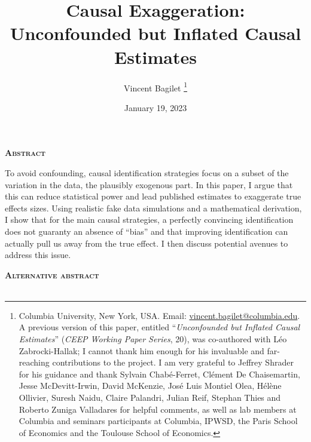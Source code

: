 \documentclass[usletter, 12pt]{article}
\begin{document}

	
	\title{Causal Exaggeration: \\ Unconfounded but Inflated Causal Estimates}

	\author{Vincent Bagilet
		\thanks{Columbia University, New York, USA. Email: \url{vincent.bagilet@columbia.edu}. 
			A previous version of this paper, entitled ``\textit{Unconfounded but Inflated Causal Estimates}'' (\textit{CEEP Working Paper Series}, 20), was co-authored with Léo Zabrocki-Hallak; I cannot thank him enough for his invaluable and far-reaching contributions to the project. I am very grateful to Jeffrey Shrader for his guidance and thank Sylvain Chabé-Ferret, Clément De Chaisemartin, Jesse McDevitt-Irwin, David McKenzie, José Luis Montiel Olea, Hélène Ollivier, Suresh Naidu, Claire Palandri, Julian Reif, Stephan Thies and Roberto Zuniga Valladares for helpful comments, as well as lab members at Columbia and seminars participants at Columbia, IPWSD, the Paris School of Economics and the Toulouse School of Economics.}
	}
	

	\date{January 19, 2023}
	
	
	\maketitle
	
	\begin{center}
		\large \textsc{\textbf{Abstract}}\\
	\end{center}
		
		To avoid confounding, causal identification strategies focus on a subset of the variation in the data, the plausibly exogenous part. In this paper, I argue that this can reduce statistical power and lead published estimates to exaggerate true effects sizes. Using realistic fake data simulations and a mathematical derivation, I show that for the main causal strategies, a perfectly convincing identification does not guaranty an absence of ``bias'' and that improving identification can actually pull us away from the true effect. I then discuss potential avenues to address this issue.\\
		
		\begin{center}
			\large \textsc{\textbf{Alternative abstract}} \normalsize\\~\\
		\end{center}
		
\end{document}

